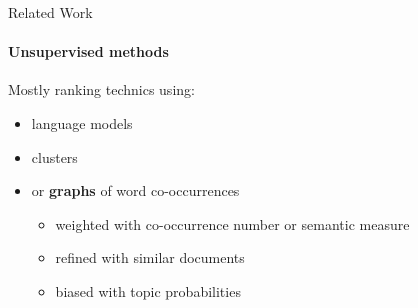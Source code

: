   \begin{frame}{Related Work}
    \framesubtitle{Unsupervised methods}

    Mostly ranking technics using:
    \begin{itemize}
      \item{language models}
      \item<2->{clusters}
      \item<3->{or \textbf{graphs} of word
                co-occurrences}
      \begin{itemize}
        \item<4->{weighted with co-occurrence number or semantic measure}
        \item<5->{refined with similar documents}
        \item<6->{biased with topic probabilities}
      \end{itemize}
    \end{itemize}
    \vfill
  \end{frame}

